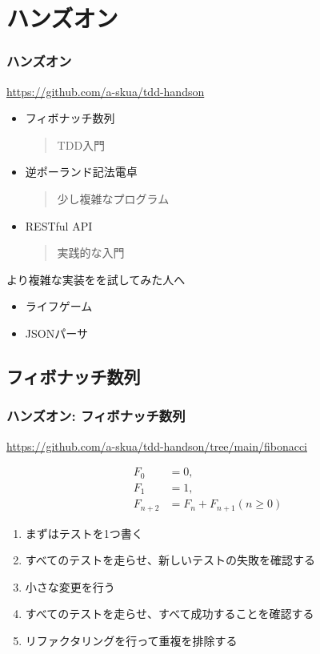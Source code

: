 \documentclass[aspectratio=169]{beamer}
\begin{document}
\section{ハンズオン}
\begin{frame}\frametitle{ハンズオン}
  {\color{gray} \url{https://github.com/a-skua/tdd-handson}}
  \begin{itemize}
    \item フィボナッチ数列
      \begin{quote}
        TDD入門
      \end{quote}
    \item 逆ポーランド記法電卓
      \begin{quote}
        少し複雑なプログラム
      \end{quote}
    \item RESTful API
      \begin{quote}
        実践的な入門
      \end{quote}
  \end{itemize}

  \color{gray}
  より複雑な実装をを試してみた人へ
  \begin{itemize}
      \color{gray}
    \item ライフゲーム
    \item JSONパーサ
  \end{itemize}
\end{frame}

\subsection{フィボナッチ数列}
\begin{frame}\frametitle{ハンズオン: フィボナッチ数列}
  {\color{gray} \url{https://github.com/a-skua/tdd-handson/tree/main/fibonacci}}

  \begin{align*}
    F_0 &= 0, \\
    F_1 &= 1, \\
    F_{n+2} &= F_n + F_{n+1} (n \ge 0)
  \end{align*}

  \begin{enumerate}
    \item まずはテストを1つ書く
    \item すべてのテストを走らせ、新しいテストの失敗を確認する
    \item 小さな変更を行う
    \item すべてのテストを走らせ、すべて成功することを確認する
    \item リファクタリングを行って重複を排除する
  \end{enumerate}
\end{frame}
\end{document}
